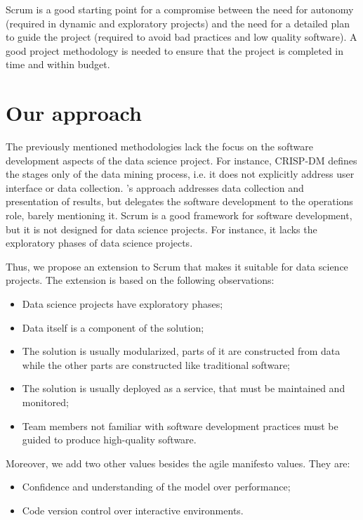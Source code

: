 Scrum is a good starting point for a compromise between the need for autonomy (required in
dynamic and exploratory projects) and the need for a detailed plan to guide the project
(required to avoid bad practices and low quality software). A good project methodology is
needed to ensure that the project is completed in time and within budget.

\newpage
\section{Our approach}

The previously mentioned methodologies lack the focus on the software development aspects of
the data science project.  For instance, CRISP-DM defines the stages only of the data
mining process, i.e. it does not explicitly address user interface or data collection.
\citeauthor{Zumel2019}'s approach addresses data collection and presentation of results, but
delegates the software development to the operations role, barely mentioning it.  Scrum is
a good framework for software development, but it is not designed for data science
projects.  For instance, it lacks the exploratory phases of data science projects.

Thus, we propose an extension to Scrum that makes it suitable for data science projects.
The extension is based on the following observations:
\begin{itemize}
  \itemsep0em
  \item Data science projects have exploratory phases;
  \item Data itself is a component of the solution;
  \item The solution is usually modularized, parts of it are constructed from data while the
    other parts are constructed like traditional software;
  \item The solution is usually deployed as a service, that must be maintained and
    monitored;
  \item Team members not familiar with software development practices must be guided to
    produce high-quality software.
\end{itemize}

Moreover, we add two other values besides the agile manifesto values.  They are:
\begin{itemize}
  \itemsep0em
  \item Confidence and understanding of the model over performance;
  \item Code version control over interactive environments.
\end{itemize}

